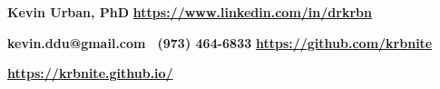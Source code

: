 \documentclass[10pt]{article}
\newcommand{\ressection}[1]{\noindent{\large\textbf{#1}}
\vspace{2pt}\hrule\vspace{4pt}}
\newcommand{\leftandright}[2]{\noindent\textbf{#1}\hfill
\textbf{#2}}
\begin{document}
%

\leftandright{\textbf{\huge{Kevin Urban, PhD}}}
{\url{https://www.linkedin.com/in/drkrbn}}

\leftandright{kevin.ddu@gmail.com \textbullet\, (973) 464-6833}
{\url{https://github.com/krbnite}} 

\leftandright{}
{\url{https://krbnite.github.io/}}





\vspace{0.5cm}
\end{document}

